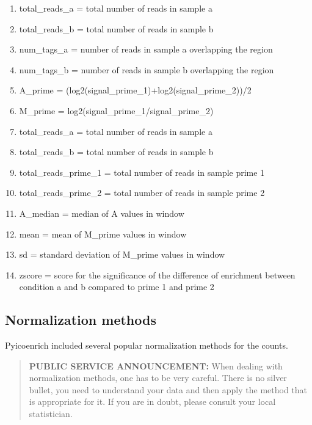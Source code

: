 \documentclass[letterpaper,10pt,english]{sphinxmanual}
\begin{document}
\begin{enumerate}
\item {} 
total\_reads\_a          =  total number of reads in sample a

\item {} 
total\_reads\_b          =  total number of reads in sample b

\item {} 
num\_tags\_a             =  number of reads in sample a overlapping the region

\item {} 
num\_tags\_b             =  number of reads in sample b overlapping the region

\item {} 
A\_prime                =  (log2(signal\_prime\_1)+log2(signal\_prime\_2))/2

\item {} 
M\_prime                =  log2(signal\_prime\_1/signal\_prime\_2)

\item {} 
total\_reads\_a          =  total number of reads in sample a

\item {} 
total\_reads\_b          =  total number of reads in sample b

\item {} 
total\_reads\_prime\_1    =  total number of reads in sample prime 1

\item {} 
total\_reads\_prime\_2    =  total number of reads in sample prime 2

\item {} 
A\_median               =   median of A values in window

\item {} 
mean                       =   mean of M\_prime values in window

\item {} 
sd                     =   standard deviation of M\_prime values in window

\item {} 
zscore                 =  score for the significance of the difference of enrichment between condition a and b compared to prime 1  and prime 2

\end{enumerate}


\subsection{Normalization methods}
\label{pyicoenrich:normalization-methods}
Pyicoenrich included several popular normalization methods for the counts.
\begin{quote}

\textbf{PUBLIC SERVICE ANNOUNCEMENT:} When dealing with normalization methods, one has to be very careful.
There is no silver bullet, you need to understand your data and then apply the method that is appropriate for it.
If you are in doubt, please consult your local statistician.
\end{quote}
\end{document}
